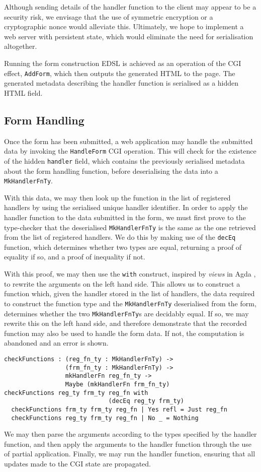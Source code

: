 \documentclass[preprint]{sigplanconf}
\begin{document}
Although sending details of the handler function to the client may appear to be a security risk, we envisage that the use of symmetric encryption or a cryptographic nonce would alleviate this. Ultimately, we hope to implement a web server with persistent state, which would eliminate the need for serialisation altogether.

Running the form construction EDSL is achieved as an operation of the CGI effect, \texttt{AddForm}, which then outputs the generated HTML to the page. The generated metadata describing the handler function is serialised as a hidden HTML field.

\subsection{Form Handling}
\label{formhandling}
Once the form has been submitted, a web application may handle the submitted data by invoking the \texttt{HandleForm} CGI operation. This will check for the existence of the hidden \texttt{handler} field, which contains the previously serialised metadata about the form handling function, before deserialising the data into a \texttt{MkHandlerFnTy}. 

With this data, we may then look up the function in the list of registered handlers by using the serialised unique handler identifier. In order to apply the handler function to the data submitted in the form, we must first prove to the type-checker that the deserialised \texttt{MkHandlerFnTy} is the same as the one retrieved from the list of registered handlers. We do this by making use of the \texttt{decEq} function, which determines whether two types are equal, returning a proof of equality if so, and a proof of inequality if not.

With this proof, we may then use the \texttt{with} construct, inspired by \textit{views} in Agda \cite{mcbride.mckinna:viewfromleft}, to rewrite the arguments on the left hand side. This allows us to construct a function which, given the handler stored in the list of handlers, the data required to construct the function type and the \texttt{MkHandlerFnTy} deserialised from the form, determines whether the two \texttt{MkHandlerFnTy}s are decidably equal. If so, we may rewrite this on the left hand side, and therefore demonstrate that the recorded function may also be used to handle the form data. If not, the computation is abandoned and an error is shown. %
{\small
\begin{verbatim}
checkFunctions : (reg_fn_ty : MkHandlerFnTy) -> 
                 (frm_fn_ty : MkHandlerFnTy) -> 
                 mkHandlerFn reg_fn_ty -> 
                 Maybe (mkHandlerFn frm_fn_ty)
checkFunctions reg_ty frm_ty reg_fn with 
                             (decEq reg_ty frm_ty)
  checkFunctions frm_ty frm_ty reg_fn | Yes refl = Just reg_fn
  checkFunctions reg_ty frm_ty reg_fn | No _ = Nothing
\end{verbatim}}
We may then parse the arguments according to the types specified by the handler function, and then apply the arguments to the handler function through the use of partial application. Finally, we may run the handler function, ensuring that all updates made to the CGI state are propagated.
\end{document}
